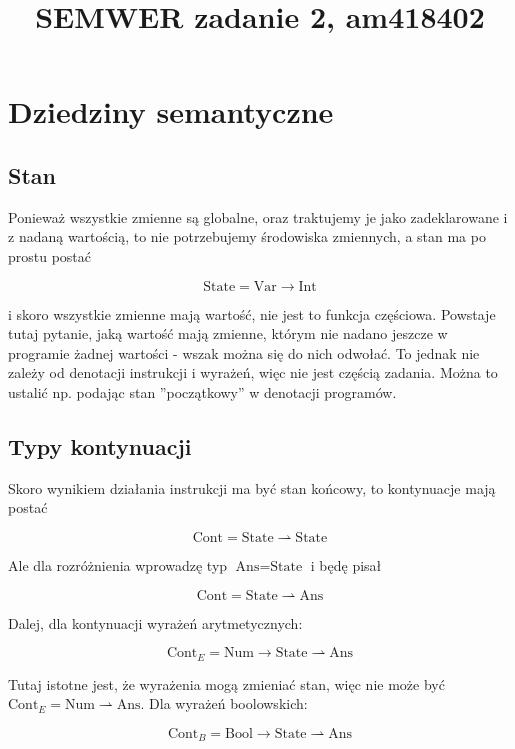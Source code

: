 \documentclass[a4paper]{article}
\begin{document}
\title{SEMWER zadanie 2, am418402}

\maketitle

\section*{Dziedziny semantyczne}

\subsection*{Stan}

Ponieważ wszystkie zmienne są globalne, oraz traktujemy je jako zadeklarowane i z nadaną wartością, to nie potrzebujemy środowiska zmiennych, a stan ma po prostu postać

$$
\text{State} = \text{Var} \longrightarrow \text{Int}
$$

i skoro wszystkie zmienne mają wartość, nie jest to funkcja częściowa. Powstaje tutaj pytanie, jaką wartość mają zmienne, którym nie nadano jeszcze w programie żadnej wartości - wszak można się do nich odwołać. To jednak nie zależy od denotacji instrukcji i wyrażeń, więc nie jest częścią zadania. Można to ustalić np. podając stan ''początkowy'' w denotacji programów.

\subsection*{Typy kontynuacji}

Skoro wynikiem działania instrukcji ma być stan końcowy, to kontynuacje mają postać

$$
\text{Cont} = \text{State} \rightharpoonup \text{State}
$$

Ale dla rozróżnienia wprowadzę typ $\text{Ans}=\text{State}$ i będę pisał

$$
\text{Cont} = \text{State} \rightharpoonup \text{Ans}
$$

Dalej, dla kontynuacji wyrażeń arytmetycznych:

$$
\text{Cont}_E = \text{Num} \longrightarrow \text{State} \rightharpoonup\text{Ans}
$$

Tutaj istotne jest, że wyrażenia mogą zmieniać stan, więc nie może być $\text{Cont}_E = \text{Num} \rightharpoonup \text{Ans}$. Dla wyrażeń boolowskich:

$$
\text{Cont}_B = \text{Bool} \longrightarrow \text{State} \rightharpoonup \text{Ans}
$$
\end{document}
